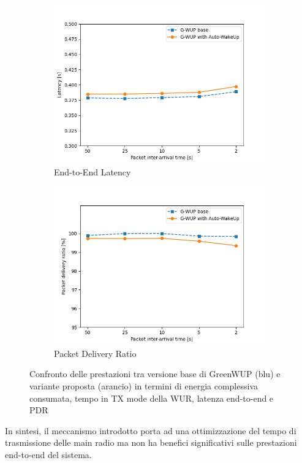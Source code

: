 \begin{figure}[H]
\begin{subfigure}[t]{0.49\linewidth}
    \includegraphics[width=1.1\linewidth]{Contents/Images/graphs/autoWakeUp/latency.png}
    \caption{End-to-End Latency}
    \label{fig:Latency_1}
  \end{subfigure}
  \begin{subfigure}[t]{0.49\linewidth}
    \includegraphics[width=1.1\linewidth]{Contents/Images/graphs/autoWakeUp/pdr.png}
    \caption{Packet Delivery Ratio}
    \label{fig:PDR_1}
  \end{subfigure}
  \caption{Confronto delle prestazioni tra versione base di GreenWUP (blu) e variante proposta (arancio) in termini di energia complessiva consumata, tempo in TX mode della WUR, latenza end-to-end e PDR}
  \label{fig:autoWakeUp}
\end{figure}

In sintesi, il meccanismo introdotto porta ad una ottimizzazione del tempo di trasmissione delle main radio ma non ha benefici significativi sulle
prestazioni end-to-end del sistema.